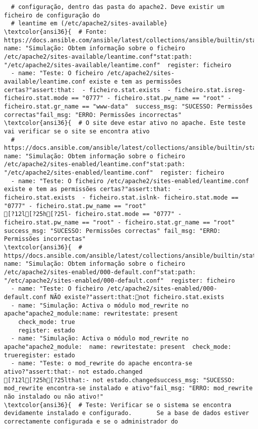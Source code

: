 \documentclass{scrartcl}
\begin{document}
\begin{Verbatim}
  # configuração, dentro das pasta do apache2. Deve existir um ficheiro de configuração do
  # leantime em (/etc/apache2/sites-available}
\textcolor{ansi36}{  # Fonte: https://docs.ansible.com/ansible/latest/collections/ansible/builtin/stat_module.html}- name: "Simulação: Obtem informação sobre o ficheiro /etc/apache2/sites-available/leantime.conf"stat:path: "/etc/apache2/sites-available/leantime.conf"  register: ficheiro
  - name: "Teste: O ficheiro /etc/apache2/sites-available/leantime.conf existe e tem as permissões certas?"assert:that:  - ficheiro.stat.exists  - ficheiro.stat.isreg- ficheiro.stat.mode == "0777" - ficheiro.stat.pw_name == "root" - ficheiro.stat.gr_name == "www-data"  success_msg: "SUCESSO: Permissões correctas"fail_msg: "ERRO: Permissões incorrectas"
\textcolor{ansi36}{  # O site deve estar ativo no apache. Este teste vai verificar se o site se encontra ativo
  # https://docs.ansible.com/ansible/latest/collections/ansible/builtin/stat_module.html}- name: "Simulação: Obtem informação sobre o ficheiro /etc/apache2/sites-enabled/leantime.conf"stat:path: "/etc/apache2/sites-enabled/leantime.conf"  register: ficheiro
  - name: "Teste: O ficheiro /etc/apache2/sites-enabled/leantime.conf existe e tem as permissões certas?"assert:that:  - ficheiro.stat.exists  - ficheiro.stat.islnk- ficheiro.stat.mode == "0777" - ficheiro.stat.pw_name == "root"
[?12l[?25h[?25l- ficheiro.stat.mode == "0777" - ficheiro.stat.pw_name == "root" - ficheiro.stat.gr_name == "root" success_msg: "SUCESSO: Permissões correctas" fail_msg: "ERRO: Permissões incorrectas"
\textcolor{ansi36}{  # https//docs.ansible.com/ansible/latest/collections/ansible/builtin/stat_module.html}- name: "Simulação: Obtem informação sobre o ficheiro /etc/apache2/sites-enabled/000-default.conf"stat:path: "/etc/apache2/sites-enabled/000-default.conf"  register: ficheiro
  - name: "Teste: O ficheiro /etc/apache2/sites-enabled/000-default.conf NÃO existe?"assert:that:not ficheiro.stat.exists
  - name: "Simulação: Activa o módulo mod_rewrite no apache"apache2_module:name: rewritestate: present
    check_mode: true
    register: estado
  - name: "Simulação: Activa o módulo mod_rewrite no apache"apache2_module:  name: rewritestate: present  check_mode: trueregister: estado
  - name: "Teste: o mod_rewrite do apache encontra-se ativo?"assert:that:- not estado.changed
[?12l[?25h[?25lthat:- not estado.changedsuccess_msg: "SUCESSO: mod_rewrite encontra-se instalado e ativo"fail_msg: "ERRO: mod_rewrite não instalado ou não ativo!"
\textcolor{ansi36}{  # Teste: Verificar se o sistema se encontra devidamente instalado e configurado.       Se a base de dados estiver correctamente configurada e se o administrador do

\end{Verbatim}
\end{document}
